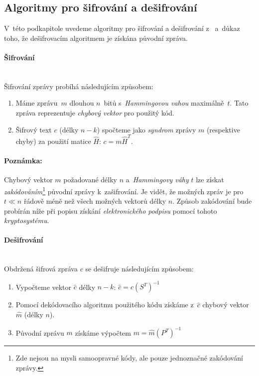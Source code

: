 \documentclass[thesis=M,czech,hidelinks]{FITthesis}[2012/06/26]
\newcommand{\0}{{\textcolor[gray]{0.75}{0}}}
\begin{document}
\subsection{Algoritmy pro šifrování a dešifrování}

V~této podkapitole uvedeme algoritmy pro šifrování a dešifrování
z~\cite{Niederreiter} a~důkaz toho, že dešifrovacím algoritmem je získána
původní zpráva.



\paragraph{Šifrování} \hfill \\
Šifrování zprávy probíhá následujícím způsobem:

\begin{enumerate}
    \item Máme zprávu~$m$ dlouhou $n$~bitů s~\emph{Hammingovou vahou} maximálně~$t$.
        Tato zpráva reprezentuje \emph{chybový vektor} pro použitý kód.
    \item Šifrový text $c$ (délky $n-k$) spočteme jako \emph{syndrom} zprávy
        $m$ (respektive chyby) za použití matice $\hat{H}$: $c = m \hat{H}^T$.
\end{enumerate}


\paragraph{Poznámka:} Chybový vektor $m$ požadované délky $n$ a~\emph{Hammingovy
váhy} $t$ lze získat \emph{zakódováním}\footnote{
    Zde nejsou na mysli samoopravné kódy, ale pouze jednoznačné zakódování
    zprávy.
} původní zprávy k~zašifrování. Je vidět, že možných zpráv je pro $t \ll n$
řádově méně než všech možných vektorů délky $n$. Způsob zakódování bude probírán
níže při popisu získání \emph{elektronického podpisu} pomocí tohoto
\emph{kryptosystému}.


\paragraph{Dešifrování} \hfill \\
Obdržená šifrová zpráva $c$ se dešifruje následujícím způsobem:

\begin{enumerate}
    \item Vypočteme vektor $\hat{c}$ délky $n-k$:
        $\hat{c} = c \left(S^T\right)^{-1} $
    \item Pomocí dekódovacího algoritmu použitého kódu získáme z~$\hat{c}$
        chybový vektor $\hat{m}$ (délky $n$).
    \item Původní zprávu $m$ získáme výpočtem
        $m = \hat{m} \left(P^T\right)^{-1}$
\end{enumerate}
\end{document}
